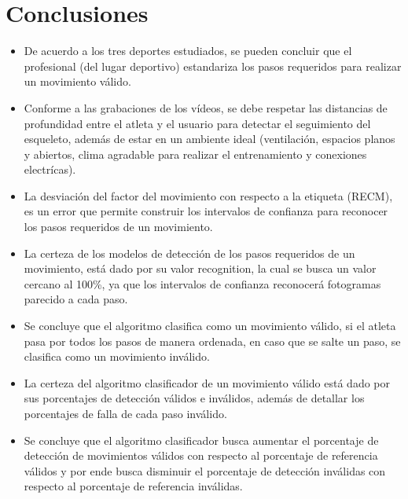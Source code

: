 \section{Conclusiones} \label{ded:con}
\begin{itemize}
\item De acuerdo a los tres deportes estudiados, se pueden concluir que el profesional (del lugar deportivo) estandariza los pasos requeridos para realizar un movimiento v\'alido.
\item Conforme a las grabaciones de los v\'ideos, se debe respetar las distancias de profundidad entre el atleta y el usuario para detectar el seguimiento del esqueleto, adem\'as de estar en un ambiente ideal (ventilaci\'on, espacios planos y  abiertos, clima agradable para realizar el entrenamiento y conexiones electr\'icas).
\item La desviaci\'on del factor del movimiento con respecto a la etiqueta (RECM), es un error que  permite construir los intervalos de confianza para reconocer los pasos requeridos de un movimiento.
\item La certeza de los modelos de detecci\'on  de los pasos requeridos de un movimiento, est\'a dado por su valor recognition, la cual se busca un valor  cercano al 100\%, ya que los intervalos de confianza reconocer\'a fotogramas parecido a cada paso.
\item Se concluye que el algoritmo clasifica como un movimiento v\'alido, si el atleta pasa por todos los pasos de manera ordenada, en caso que se salte un paso, se clasifica como un movimiento inv\'alido.
\item La certeza del algoritmo clasificador de un movimiento v\'alido est\'a dado por sus porcentajes de detecci\'on v\'alidos e inv\'alidos, adem\'as de detallar los porcentajes de falla de cada paso inv\'alido.
\item Se concluye que el algoritmo clasificador busca aumentar el porcentaje de detecci\'on de movimientos v\'alidos con respecto al porcentaje de referencia v\'alidos y por ende busca disminuir el porcentaje de detecci\'on inv\'alidas con respecto al porcentaje de referencia inv\'alidas.
\end{itemize}